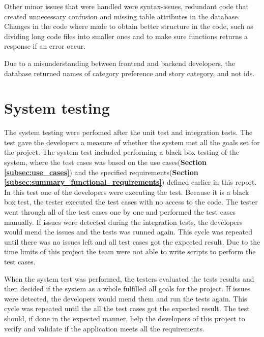 Other minor issues that were handled were syntax-issues, redundant code that created unnecessary confusion and missing table attributes in the database.\newline
Changes in the code where made to obtain better structure in the code, such as dividing long code files into smaller ones and to make sure functions returns a response if an error occur. \newline

Due to a misunderstanding between frontend and backend developers, the database returned names of category preference and story category, and not ids. \newline


\section{System testing}
The system testing were perfomed after the unit test and integration tests. The test gave the developers a measure of whether the system met all the goals set for the project.  The system test included performing a black box testing of the system, where the test cases was based on the use cases(\textbf{Section \ref{subsec:use_cases}}) and the specified requirements(\textbf{Section \ref{subsec:summary_functional_requirements}})  defined earlier in this report. \newline
In this test one of the developers were executing the test. Because it is a black box test, the tester executed the test cases with no access to the code. The tester went through all of the test cases one by one and performed the test cases manually. If issues were detected during the integration tests, the developers would mend the issues and the tests was runned again. This cycle was repeated until there was no issues left and all test cases got the expected result. Due to the time limits of this project the team were not able to write scripts to perform the test cases. \newline

When the system test was performed, the testers evaluated the tests results and then decided if the system as a whole fulfilled all goals for the project. If issues were detected, the developers would mend them and run the tests again. This cycle was repeated until the all the test cases got the expected result. The test should, if done in the expected manner, help the developers of this project to verify and validate if the application meets all the requirements.\newline

